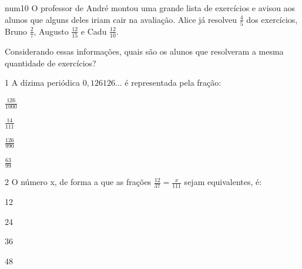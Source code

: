 {{num{10} O professor de André montou uma grande lista de exercícios 
e avisou aos alunos que alguns deles iriam cair na avaliação. Alice
já resolveu $\frac{4}{5}$ dos exercícios, Bruno $\frac{2}{7}$, Augusto 
$\frac{12}{15}$ e Cadu $\frac{12}{10}$.

Considerando essas informações, quais são os alunos que resolveram a mesma
quantidade de exercícios?



\num{1} A dízima periódica $0,126126\ldots$ é representada pela fração:

\begin{escolha}

\item $\frac{126}{1000}$

\item $\frac{14}{111}$

\item $\frac{126}{990}$

\item $\frac{63}{99}$

\end{escolha}


\num{2} O número x, de forma a que as frações
$\frac{12}{37} = \frac{x}{111}$ sejam equivalentes, é:

\begin{escolha}

  \item 12

  \item 24

  \item 36

  \item 48

\end{escolha}

}}
